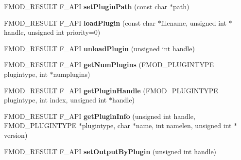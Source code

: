 \begin{DoxyCompactItemize}
\item 
\hypertarget{class_f_m_o_d_1_1_system_ae1a00669920caf97abb5228d2053a28a}{F\+M\+O\+D\+\_\+\+R\+E\+S\+U\+L\+T F\+\_\+\+A\+P\+I {\bfseries set\+Plugin\+Path} (const char $\ast$path)}\label{class_f_m_o_d_1_1_system_ae1a00669920caf97abb5228d2053a28a}

\item 
\hypertarget{class_f_m_o_d_1_1_system_a046e94ca835e30f60564dbf44cfa111f}{F\+M\+O\+D\+\_\+\+R\+E\+S\+U\+L\+T F\+\_\+\+A\+P\+I {\bfseries load\+Plugin} (const char $\ast$filename, unsigned int $\ast$handle, unsigned int priority=0)}\label{class_f_m_o_d_1_1_system_a046e94ca835e30f60564dbf44cfa111f}

\item 
\hypertarget{class_f_m_o_d_1_1_system_a07ae0f13eb4b291651f34c8fa59d76ff}{F\+M\+O\+D\+\_\+\+R\+E\+S\+U\+L\+T F\+\_\+\+A\+P\+I {\bfseries unload\+Plugin} (unsigned int handle)}\label{class_f_m_o_d_1_1_system_a07ae0f13eb4b291651f34c8fa59d76ff}

\item 
\hypertarget{class_f_m_o_d_1_1_system_a1a066a03febf0c76a43162e5abc09c7b}{F\+M\+O\+D\+\_\+\+R\+E\+S\+U\+L\+T F\+\_\+\+A\+P\+I {\bfseries get\+Num\+Plugins} (F\+M\+O\+D\+\_\+\+P\+L\+U\+G\+I\+N\+T\+Y\+P\+E plugintype, int $\ast$numplugins)}\label{class_f_m_o_d_1_1_system_a1a066a03febf0c76a43162e5abc09c7b}

\item 
\hypertarget{class_f_m_o_d_1_1_system_aa94d36d0d28721e35ec47fb1ef06ce1f}{F\+M\+O\+D\+\_\+\+R\+E\+S\+U\+L\+T F\+\_\+\+A\+P\+I {\bfseries get\+Plugin\+Handle} (F\+M\+O\+D\+\_\+\+P\+L\+U\+G\+I\+N\+T\+Y\+P\+E plugintype, int index, unsigned int $\ast$handle)}\label{class_f_m_o_d_1_1_system_aa94d36d0d28721e35ec47fb1ef06ce1f}

\item 
\hypertarget{class_f_m_o_d_1_1_system_a68da30ad69d2f9320ddbdc4ced35fec1}{F\+M\+O\+D\+\_\+\+R\+E\+S\+U\+L\+T F\+\_\+\+A\+P\+I {\bfseries get\+Plugin\+Info} (unsigned int handle, F\+M\+O\+D\+\_\+\+P\+L\+U\+G\+I\+N\+T\+Y\+P\+E $\ast$plugintype, char $\ast$name, int namelen, unsigned int $\ast$version)}\label{class_f_m_o_d_1_1_system_a68da30ad69d2f9320ddbdc4ced35fec1}

\item 
\hypertarget{class_f_m_o_d_1_1_system_a014b2d9623aca816e8054867517067ff}{F\+M\+O\+D\+\_\+\+R\+E\+S\+U\+L\+T F\+\_\+\+A\+P\+I {\bfseries set\+Output\+By\+Plugin} (unsigned int handle)}\label{class_f_m_o_d_1_1_system_a014b2d9623aca816e8054867517067ff}


\end{DoxyCompactItemize}
